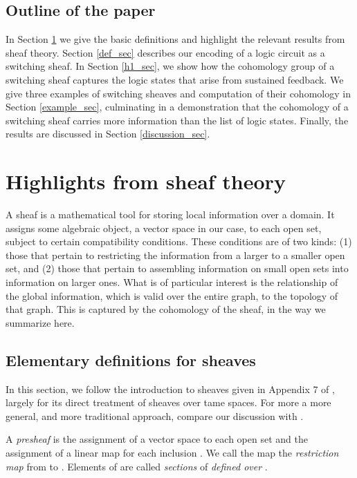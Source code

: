 \documentclass{amsart}
\theoremstyle{plain}
\theoremstyle{definition}
\begin{document}
\subsection{Outline of the paper}

In Section \ref{sheaf_sec} we give the basic definitions and highlight
the relevant results from sheaf theory.  Section
\ref{def_sec} describes our encoding of a logic circuit as a
switching sheaf.  In Section \ref{h1_sec}, we show how the cohomology
group of a switching sheaf captures the logic states that arise from
sustained feedback.  We give three examples of switching sheaves and
computation of their cohomology in Section \ref{example_sec},
culminating in a demonstration that the cohomology of a
switching sheaf carries more information than the list of logic
states.  Finally, the results are discussed in Section
\ref{discussion_sec}.

\section{Highlights from sheaf theory}
\label{sheaf_sec}

A sheaf is a mathematical tool for storing local information over a
domain.  It assigns some algebraic object, a vector space in our case,
to each open set, subject to certain compatibility conditions.  These
conditions are of two kinds: (1) those that pertain to restricting the
information from a larger to a smaller open set, and (2) those that
pertain to assembling information on small open sets into information
on larger ones.  What is of particular interest is the relationship of
the global information, which is valid over the entire graph, to the
topology of that graph.  This is captured by the cohomology of the
sheaf, in the way we summarize here.

\subsection{Elementary definitions for sheaves}
In this section, we follow the introduction to sheaves given in
Appendix 7 of \cite{Hubbard}, largely for its direct treatment of
sheaves over tame spaces.  For more a more general, and more
traditional approach, compare our discussion with \cite{Bredon}.

A {\it presheaf}  is the assignment of a vector space  to each
open set  and the assignment of a linear map  for
each inclusion .  We call the map  the {\it
  restriction map} from  to .  Elements of  are called
{\it sections} of  {\it defined over} .  
\end{document}
